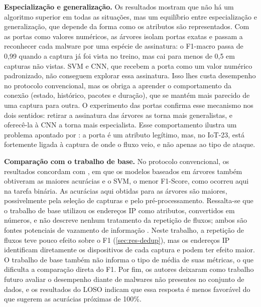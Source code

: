 \documentclass[alpha-refs,brazilian]{CC-EC_TF-TC}
\begin{document}
\textbf{Especialização e generalização.} Os resultados mostram que não há um algoritmo superior em todas as situações, mas um equilíbrio entre especialização e generalização, que depende da forma como os atributos são representados. Com as portas como valores numéricos, as árvores isolam portas exatas e passam a reconhecer cada malware por uma espécie de assinatura: o F1-macro passa de 0,99 quando a captura já foi vista no treino, mas cai para menos de 0,5 em capturas não vistas. SVM e CNN, que recebem a porta como um valor numérico padronizado, não conseguem explorar essa assinatura. Isso lhes custa desempenho no protocolo convencional, mas os obriga a aprender o comportamento da conexão (estado, histórico, pacotes e duração), que se mantém mais parecido de uma captura para outra. O experimento das portas confirma esse mecanismo nos dois sentidos: retirar a assinatura das árvores as torna mais generalistas, e oferecê-la à CNN a torna mais especialista. Esse comportamento ilustra um problema apontado por \citet{arp2022dos}: a porta é um atributo legítimo, mas, no IoT-23, está fortemente ligada à captura de onde o fluxo veio, e não apenas ao tipo de ataque.

\textbf{Comparação com o trabalho de base.} No protocolo convencional, os resultados concordam com \citet{souza2024avaliacao}, em que os modelos baseados em árvores também obtiveram as maiores acurácias e o SVM, o menor F1-Score, como ocorreu aqui na tarefa binária. As acurácias aqui obtidas para as árvores são maiores, possivelmente pela seleção de capturas e pelo pré-processamento. Ressalta-se que o trabalho de base utilizou os endereços IP como atributos, convertidos em números, e não descreve nenhum tratamento da repetição de fluxos; ambos são fontes potenciais de vazamento de informação \citep{kapoor2023leakage}. Neste trabalho, a repetição de fluxos teve pouco efeito sobre o F1 (\autoref{sec:res-dedup}), mas os endereços IP identificam diretamente os dispositivos de cada captura e podem ter efeito maior. O trabalho de base também não informa o tipo de média de suas métricas, o que dificulta a comparação direta do F1. Por fim, os autores deixaram como trabalho futuro avaliar o desempenho diante de malwares não presentes no conjunto de dados, e os resultados do LOSO indicam que essa resposta é menos favorável do que sugerem as acurácias próximas de 100\%.
\end{document}

